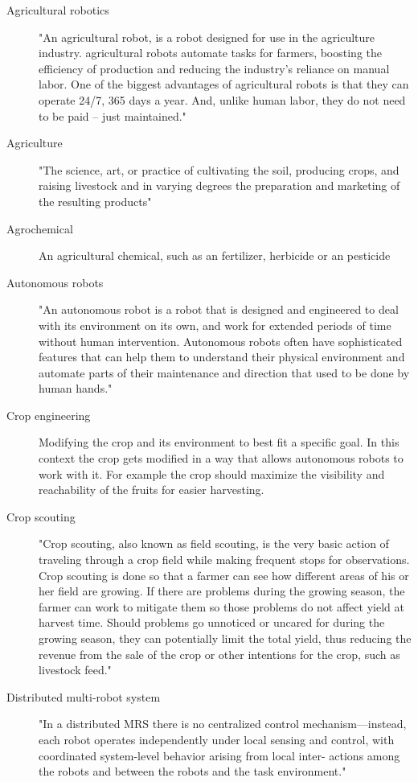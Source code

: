     \begin{description}
        \item[Agricultural robotics] "An agricultural robot, is a robot designed for use in the agriculture industry. agricultural robots automate tasks for farmers, boosting the efficiency of production and reducing the industry’s reliance on manual labor. One of the biggest advantages of agricultural robots is that they can operate 24/7, 365 days a year. And, unlike human labor, they do not need to be paid – just maintained." \cite{MarketBusinessNews2020} 
        \item[Agriculture] "The science, art, or practice of cultivating the soil, producing crops, and raising livestock and in varying degrees the preparation and marketing of the resulting products" \cite{MerriamWebster2020}
        \item[Agrochemical] An agricultural chemical, such as an fertilizer, herbicide or an pesticide
        \item[Autonomous robots] "An autonomous robot is a robot that is designed and engineered to deal with its environment on its own, and work for extended periods of time without human intervention. Autonomous robots often have sophisticated features that can help them to understand their physical environment and automate parts of their maintenance and direction that used to be done by human hands." \cite{Technopedia2020}    
        \item[Crop engineering]  Modifying the crop and its environment to best fit a specific goal. In this context the crop gets modified in a way that allows autonomous robots to work with it. For example the crop should maximize the visibility and reachability of the fruits for easier harvesting.
        \item[Crop scouting]  "Crop scouting, also known as field scouting, is the very basic action of traveling through a crop field while making frequent stops for observations. Crop scouting is done so that a farmer can see how different areas of his or her field are growing. If there are problems during the growing season, the farmer can work to mitigate them so those problems do not affect yield at harvest time. Should problems go unnoticed or uncared for during the growing season, they can potentially limit the total yield, thus reducing the revenue from the sale of the crop or other intentions for the crop, such as livestock feed." \cite{Farms2020}
        \item[Distributed multi-robot system] "In a distributed MRS there is no centralized control mechanism—instead, each robot operates independently under local sensing and control, with coordinated system-level behavior arising from local inter- actions among the robots and between the robots and the task environment." \cite{Lerman2006}

\end{description}
